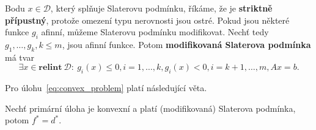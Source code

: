 Bodu $x \in \mathcal{D}$, který splňuje Slaterovu podmínku, říkáme, že je \textbf{striktně přípustný}, protože omezení typu nerovnosti jsou ostré. Pokud jsou některé funkce $g_i$ afinní, můžeme Slaterovu podmínku modifikovat. Nechť tedy $g_1, \dots, g_k, k \leq m$, jsou afinní funkce. Potom \textbf{modifikovaná Slaterova podmínka} má tvar
$$
    \exists x \in \textbf{relint}\ \mathcal{D}:\ g_i(x) \leq 0, i = 1, \dots, k, g_i(x) < 0, i = k+1, \dots, m, Ax = b.
$$

\noindent Pro úlohu~\ref{eq:convex_problem} platí následující věta.
\begin{vt2}[Slaterova]
    Nechť primární úloha je konvexní a platí (modifikovaná) Slaterova podmínka, potom $f^* = d^*$.
\end{vt2}


